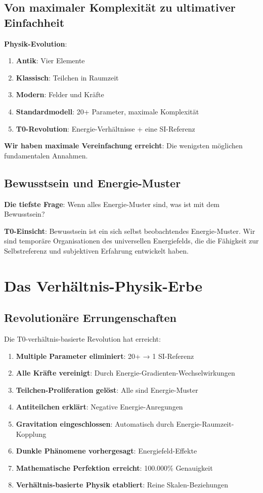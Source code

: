\documentclass[12pt,a4paper]{article}
\theoremstyle{definition}
\theoremstyle{remark}
\begin{document}
	\subsection{Von maximaler Komplexität zu ultimativer Einfachheit}
	
	\textbf{Physik-Evolution}:
	\begin{enumerate}
		\item \textbf{Antik}: Vier Elemente
		\item \textbf{Klassisch}: Teilchen in Raumzeit
		\item \textbf{Modern}: Felder und Kräfte
		\item \textbf{Standardmodell}: 20+ Parameter, maximale Komplexität
		\item \textbf{T0-Revolution}: Energie-Verhältnisse + eine SI-Referenz
	\end{enumerate}
	
	\textbf{Wir haben maximale Vereinfachung erreicht}: Die wenigsten möglichen fundamentalen Annahmen.
	
	\subsection{Bewusstsein und Energie-Muster}
	
	\textbf{Die tiefste Frage}: Wenn alles Energie-Muster sind, was ist mit dem Bewusstsein?
	
	\textbf{T0-Einsicht}: Bewusstsein ist ein sich selbst beobachtendes Energie-Muster. Wir sind temporäre Organisationen des universellen Energiefelds, die die Fähigkeit zur Selbstreferenz und subjektiven Erfahrung entwickelt haben.
	
	\section{Das Verhältnis-Physik-Erbe}
	
	\subsection{Revolutionäre Errungenschaften}
	
	Die T0-verhältnis-basierte Revolution hat erreicht:
	
	\begin{enumerate}
		\item \textbf{Multiple Parameter eliminiert}: 20+ → 1 SI-Referenz
		\item \textbf{Alle Kräfte vereinigt}: Durch Energie-Gradienten-Wechselwirkungen
		\item \textbf{Teilchen-Proliferation gelöst}: Alle sind Energie-Muster
		\item \textbf{Antiteilchen erklärt}: Negative Energie-Anregungen
		\item \textbf{Gravitation eingeschlossen}: Automatisch durch Energie-Raumzeit-Kopplung
		\item \textbf{Dunkle Phänomene vorhergesagt}: Energiefeld-Effekte
		\item \textbf{Mathematische Perfektion erreicht}: 100.000\% Genauigkeit
		\item \textbf{Verhältnis-basierte Physik etabliert}: Reine Skalen-Beziehungen
	\end{enumerate}
	
\end{document}
